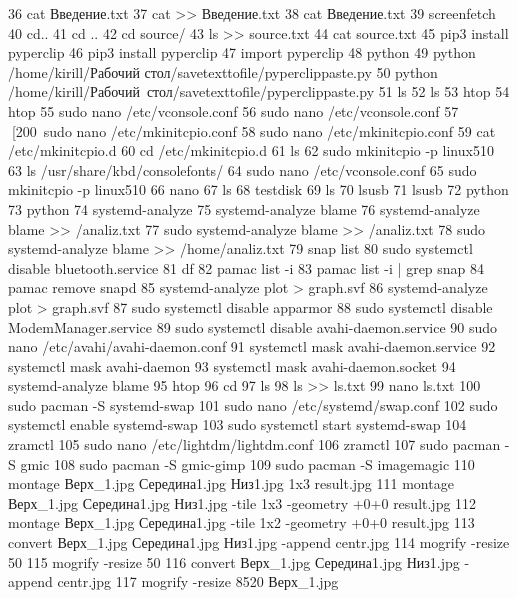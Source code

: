    36  cat Введение.txt 
   37  cat >> Введение.txt 
   38  cat Введение.txt 
   39  screenfetch 
   40  cd..
   41  cd ..
   42  cd source/
   43  ls >> source.txt
   44  cat source.txt 
   45  pip3 install pyperclip
   46  pip3 install pyperclip
   47  import pyperclip
   48  python
   49  python /home/kirill/Рабочий стол/savetexttofile/pyperclippaste.py
   50  python /home/kirill/Рабочий\ стол/savetexttofile/pyperclippaste.py
   51  ls
   52  ls
   53  htop 
   54  htop
   55  sudo nano /etc/vconsole.conf 
   56  sudo nano /etc/vconsole.conf 
   57  [200~sudo nano /etc/mkinitcpio.conf
   58  sudo nano /etc/mkinitcpio.conf
   59  cat /etc/mkinitcpio.d
   60  cd /etc/mkinitcpio.d
   61  ls
   62  sudo mkinitcpio -p linux510
   63  ls /usr/share/kbd/consolefonts/
   64  sudo nano /etc/vconsole.conf 
   65  sudo mkinitcpio -p linux510
   66  nano 
   67  ls
   68  testdisk 
   69  ls
   70  lsusb
   71  lsusb
   72  python
   73  python
   74  systemd-analyze 
   75  systemd-analyze blame
   76  systemd-analyze blame >> /analiz.txt
   77  sudo systemd-analyze blame >> /analiz.txt
   78  sudo systemd-analyze blame >> /home/analiz.txt
   79  snap list
   80  sudo systemctl disable bluetooth.service
   81  df
   82  pamac list -i
   83  pamac list -i | grep snap
   84  pamac remove snapd
   85  systemd-analyze plot > graph.svf
   86  systemd-analyze plot > graph.svf
   87  sudo systemctl disable apparmor
   88  sudo systemctl disable ModemManager.service
   89  sudo systemctl disable avahi-daemon.service
   90  sudo nano /etc/avahi/avahi-daemon.conf 
   91  systemctl mask avahi-daemon.service 
   92  systemctl mask avahi-daemon
   93  systemctl mask avahi-daemon.socket 
   94  systemd-analyze blame 
   95  htop 
   96  cd
   97  ls
   98  ls >> ls.txt
   99  nano ls.txt
  100  sudo pacman -S systemd-swap
  101  sudo nano /etc/systemd/swap.conf 
  102  sudo systemctl enable systemd-swap 
  103  sudo systemctl start systemd-swap 
  104  zramctl 
  105  sudo nano /etc/lightdm/lightdm.conf
  106  zramctl 
  107  sudo pacman -S gmic
  108  sudo pacman -S gmic-gimp
  109  sudo pacman -S imagemagic
  110  montage Верх_1.jpg Середина1.jpg Низ1.jpg 1x3 result.jpg
  111  montage Верх_1.jpg Середина1.jpg Низ1.jpg -tile 1x3 -geometry +0+0 result.jpg
  112  montage Верх_1.jpg Середина1.jpg -tile 1x2 -geometry +0+0 result.jpg
  113  convert Верх_1.jpg Середина1.jpg Низ1.jpg -append centr.jpg
  114  mogrify -resize 50%
  115  mogrify -resize 50%
  116  convert Верх_1.jpg Середина1.jpg Низ1.jpg -append centr.jpg
  117  mogrify -resize 8520 Верх_1.jpg
